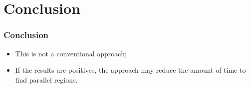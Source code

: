 \documentclass{beamer}
\begin{document}
\section{Conclusion}

\begin{frame}
  \frametitle{Conclusion}

  \begin{itemize}
    \item<1-> This is not a conventional approach;
    \item<2-> If the results are positives, the approach may reduce the amount of time to find parallel regions.
  \end{itemize}
\end{frame}
\end{document}
